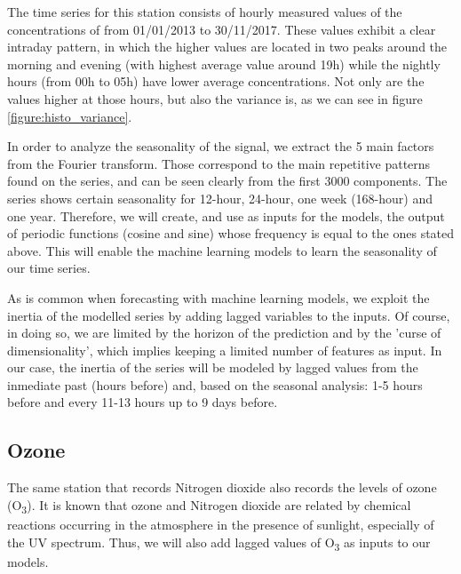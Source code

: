 \documentclass[a4paper,3p,sort&compress]{elsarticle}
\begin{document}
The time series for this station consists of hourly measured values of
the concentrations of \no from 01/01/2013 to
30/11/2017. These values exhibit a clear intraday pattern, in which
the higher values are located in two peaks around the morning and
evening (with highest average value around 19h) while the nightly
hours (from 00h to 05h) have lower average concentrations.  Not only
are the values higher at those hours, but also the variance is, as we
can see in figure \ref{figure:histo_variance}.
 
In order to analyze the seasonality of the signal, we extract the 5
main factors from the Fourier transform. Those correspond to the main
repetitive patterns found on the series, and can be seen clearly from
the first 3000 components. The series shows certain seasonality for
12-hour, 24-hour, one week (168-hour) and one year.  Therefore, we will
create, and use as inputs for the models, the output of periodic
functions (cosine and sine) whose frequency is equal to the ones
stated above. This will enable the machine learning models to learn
the seasonality of our time series.

As is common when forecasting with machine learning models, we exploit
the inertia of the modelled series by adding lagged variables to the
inputs. Of course, in doing so, we are limited by the horizon of the
prediction and by the 'curse of dimensionality', which implies keeping
a limited number of features as input. In our case, the inertia of the
series will be modeled by lagged values from the inmediate past (hours
before) and, based on the seasonal analysis: 1-5 hours before and
every 11-13 hours up to 9 days before.

\subsection{Ozone}


The same station that records Nitrogen dioxide also records the levels
of ozone (O\textsubscript{3}). It is known that ozone and Nitrogen
dioxide are related by chemical reactions occurring in the atmosphere
in the presence of sunlight, especially of the UV spectrum.  %
Thus, we will also add lagged values of O\textsubscript{3} as inputs
to our models.
\end{document}
